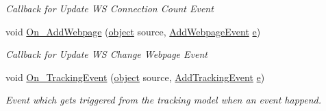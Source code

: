 \begin{DoxyCompactItemize}
\begin{DoxyCompactList}\small\item\em Callback for Update W\+S Connection Count Event \end{DoxyCompactList}\item 
void \hyperlink{class_web_analyzer_1_1_controller_1_1_test_controller_aac7dd97807dbc4bb9f7c8127b7f210e4}{On\+\_\+\+Add\+Webpage} (\hyperlink{_u_i_2_h_t_m_l_resources_2js_2lib_2underscore_8min_8js_aae18b7515bb2bc4137586506e7c0c903}{object} source, \hyperlink{class_web_analyzer_1_1_events_1_1_add_webpage_event}{Add\+Webpage\+Event} \hyperlink{_u_i_2_h_t_m_l_resources_2js_2lib_2bootstrap_8min_8js_ab5902775854a8b8440bcd25e0fe1c120}{e})
\begin{DoxyCompactList}\small\item\em Callback for Update W\+S Change Webpage Event \end{DoxyCompactList}\item 
void \hyperlink{class_web_analyzer_1_1_controller_1_1_test_controller_afd9f2518fa8375fbbb40b5267116316d}{On\+\_\+\+Tracking\+Event} (\hyperlink{_u_i_2_h_t_m_l_resources_2js_2lib_2underscore_8min_8js_aae18b7515bb2bc4137586506e7c0c903}{object} source, \hyperlink{class_web_analyzer_1_1_events_1_1_add_tracking_event}{Add\+Tracking\+Event} \hyperlink{_u_i_2_h_t_m_l_resources_2js_2lib_2bootstrap_8min_8js_ab5902775854a8b8440bcd25e0fe1c120}{e})
\begin{DoxyCompactList}\small\item\em Event which gets triggered from the tracking model when an event happend. \end{DoxyCompactList}\end{DoxyCompactItemize}
